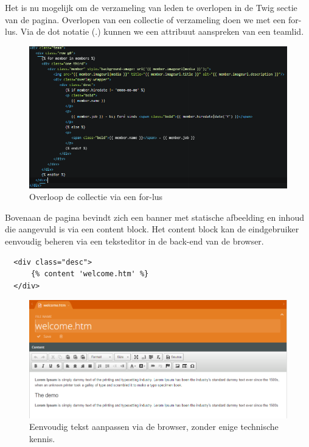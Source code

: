 \noindent
Het is nu mogelijk om de verzameling van leden te overlopen in de Twig sectie van de pagina. Overlopen van een collectie of verzameling doen we met een for-lus. 
Via de dot notatie (.) kunnen we een attribuut aanspreken van een teamlid. 

\begin{figure}[!ht]
  \includegraphics[width=\linewidth]{img/oc-plugin-teammember-page.png}
  \caption{Overloop de collectie via een for-lus}
  \label{fig:Teammember Front-end page.}
\end{figure}

\noindent
Bovenaan de pagina bevindt zich een banner met statische afbeelding en inhoud die aangevuld is via een content block. Het content block kan de eindgebruiker eenvoudig beheren via een teksteditor in de back-end van de browser.  

\begin{verbatim}
  <div class="desc">
      {% content 'welcome.htm' %}
  </div>
\end{verbatim}

\begin{figure}[!ht]
  \includegraphics[width=\linewidth]{img/oc-contentblock.png}
  \caption{Eenvoudig tekst aanpassen via de browser, zonder enige technische kennis.}
  \label{fig:Teammember Content Block.}
\end{figure}

